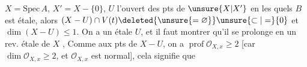   $X=\mathrm{Spec}\,A$,  $X'=X-\{0\}$, $U$ l'ouvert des
pts de $\unsure{X|X'}$ en les quels $B$ est étale, alors
\deleted{[si $U\ne X$]} $(X-U)\cap V(t)\deleted{\unsure{=\varnothing}}\unsure{\subset|=}\{0\}$ et
$\dim(X-U)\leq 1$. On a un  étale
  $U$, et il faut montrer qu'il se
prolonge en un rev. étale de $X$ , 
 
Comme aux pts de $X-U$,
on a $\operatorname{prof}\mathscr O_{X,x}\geq 2$ [car $\dim\mathscr O_{X,x}\geq 2$,
et $\mathscr O_{X,x}$ est normal], cela signifie que


